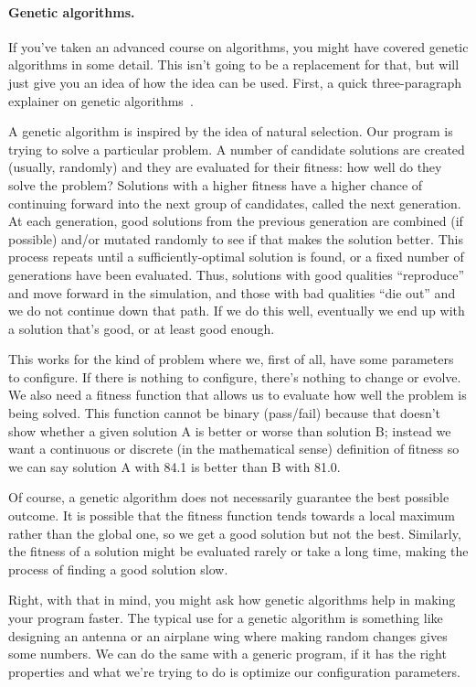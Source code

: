 \documentclass[a4paper]{report}
\begin{document}
\paragraph{Genetic algorithms.}
If you've taken an advanced course on algorithms, you might have covered genetic algorithms in some detail. This isn't going to be a replacement for that, but will just give you an idea of how the idea can be used. First, a quick three-paragraph explainer on genetic algorithms~\cite{genetic}.

A genetic algorithm is inspired by the idea of natural selection. Our program is trying to solve a particular problem. A number of candidate solutions are created (usually, randomly) and they are evaluated for their fitness: how well do they solve the problem? Solutions with a higher fitness have a higher chance of continuing forward into the next group of candidates, called the next generation. At each generation, good solutions from the previous generation are combined (if possible) and/or mutated randomly to see if that makes the solution better. This process repeats until a sufficiently-optimal solution is found, or a fixed number of generations have been evaluated. Thus, solutions with good qualities ``reproduce'' and move forward in the simulation, and those with bad qualities ``die out'' and we do not continue down that path. If we do this well, eventually we end up with a solution that's good, or at least good enough.

This works for the kind of problem where we, first of all, have some parameters to configure. If there is nothing to configure, there's nothing to change or evolve. We also need a fitness function that allows us to evaluate how well the problem is being solved. This function cannot be binary (pass/fail) because that doesn't show whether a given solution A is better or worse than solution B; instead we want a continuous or discrete (in the mathematical sense) definition of fitness so we can say solution A with 84.1 is better than B with 81.0.

Of course, a genetic algorithm does not necessarily guarantee the best possible outcome. It is possible that the fitness function tends towards a local maximum rather than the global one, so we get a good solution but not the best. Similarly, the fitness of a solution might be evaluated rarely or take a long time, making the process of finding a good solution slow.

Right, with that in mind, you might ask how genetic algorithms help in making your program faster. The typical use for a genetic algorithm is something like designing an antenna or an airplane wing where making random changes gives some numbers. We can do the same with a generic program, if it has the right properties and what we're trying to do is optimize our configuration parameters.
\end{document}
